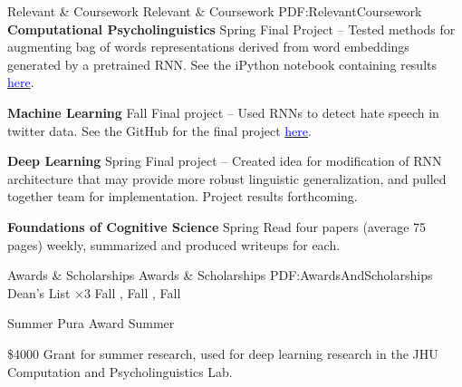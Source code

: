 \documentclass[letterpaper,MMMyyyy,nonstopmode,14pt]{simpleresumecv}
\begin{document}
\begin{Body}
\Section
{Relevant \&\newline
Coursework}
{Relevant \& Coursework}
{PDF:RelevantCoursework}
\Entry
\textbf{Computational Psycholinguistics}
\hfill
Spring 
\BulletItem Final Project -- Tested methods for augmenting bag of words representations derived from word embeddings generated by a pretrained RNN. See the iPython notebook containing results \href{https://colab.research.google.com/drive/1kFQBBpB4OsvXB-TgVbNJ3vMr8DvYw9DF?usp=sharing}{\textcolor{blue}{here}}.

\Entry
\textbf{Machine Learning}
\hfill
Fall 
\BulletItem Final project -- Used RNNs to detect hate speech in twitter data. See the GitHub for the final project \href{https://github.com/adityayedetore/hate-speech-and-offensive-language}{\textcolor{blue}{here}}. 

\Entry
\textbf{Deep Learning}
\hfill
Spring 
\BulletItem Final project -- Created idea for modification of RNN architecture that may provide more robust linguistic generalization, and pulled together team for implementation. Project results forthcoming. 

\Entry
\textbf{Foundations of Cognitive Science}
\hfill
Spring 
\BulletItem Read four papers (average 75 pages) weekly, summarized and produced writeups for each. 

\Section
{Awards \&\newline
Scholarships}
{Awards \& Scholarships}
{PDF:AwardsAndScholarships}
\BulletItem
Dean's List $\times3$
\hfill
Fall , Fall , Fall   

\BulletItem
Summer Pura Award
\hfill
Summer 
\begin{Detail}
    \SubBulletItem \$4000 Grant for summer research, used for deep learning research in the JHU Computation and Psycholinguistics Lab. 
\end{Detail}
\end{Body}

\end{document}
